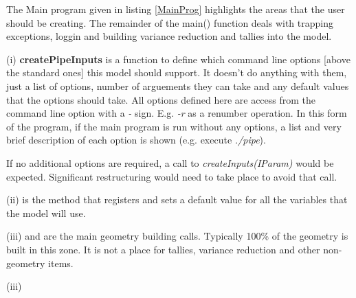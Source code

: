 The Main program given in listing \ref{MainProg} highlights the areas
that the user should be creating. The remainder of the main() function
deals with trapping exceptions, loggin and building variance reduction
and tallies into the model.

(i) {\bf createPipeInputs} is a 
function to define which command line options [above the standard ones]
this model should support. It doesn't do anything with them, just a
list of options, number of arguements they can take and any default
values that the options should take. All options defined here are
access from the command line option with a {\it -} sign. E.g. {\it -r} as a
renumber operation. In this form of the program, if the main program
is run without any options, a list and very brief description of each
option is shown (e.g. execute {\it ./pipe}).

If no additional options are required, a call to
{\it createInputs(IParam)} would be expected. Significant restructuring
would need to take place to avoid that call.

(ii)  is the method that registers
and sets a default value for all the variables that the model will
use. 

(iii)  and  are the
main geometry building calls. Typically 100\% of the geometry is built
in this zone. It is not a place for tallies, variance reduction and other
non-geometry items.

(iii) 



